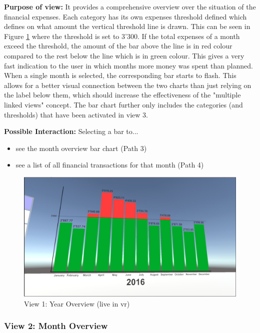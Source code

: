 \textbf{Purpose of view:} It provides a comprehensive overview over the situation of the financial expenses. Each category has its own expenses threshold defined which defines on what amount the vertical threshold line is drawn. This can be seen in Figure \ref{fig:unityview1} where the threshold is set to 3'300. If the total expenses of a month exceed the threshold, the amount of the bar above the line is in red colour compared to the rest below the line which is in green colour. This gives a very fast indication to the user in which months more money was spent than planned. When a single month is selected, the corresponding bar starts to flash. This allows for a better visual connection between the two charts than just relying on the label below them, which should increase the effectiveness of the "multiple linked views" concept. The bar chart further only includes the categories (and thresholds) that have been activated in view 3.

\textbf{Possible Interaction:} Selecting a bar to...
\begin{itemize}[noitemsep,nolistsep]
	\item see the month overview bar chart (Path 3)
	\item see a list of all financial transactions for that month (Path 4)
\end{itemize}

\begin{figure}[t]
	\begin{center}
		\includegraphics[width=12cm]{03_Figures/08_Development/View1_YearOverview.png}
		\caption{View 1: Year Overview (live in \gls{vr})}
		\label{fig:unityview1}
	\end{center}
\end{figure}


\subsubsection{View 2: Month Overview}

